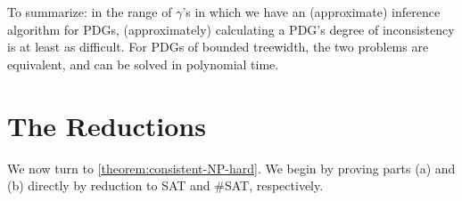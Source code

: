 To summarize: in the range of $\gamma$'s in which we have an (approximate) inference algorithm for PDGs, (approximately) calculating a PDG's degree of inconsistency is at least as difficult.
For PDGs of bounded treewidth, the two problems are equivalent, and can be solved in polynomial time. 



\section{The Reductions}
    \label{proofs:hardness-results}

We now turn to \cref{theorem:consistent-NP-hard}. We begin by proving
parts (a) and (b) directly
by reduction to SAT and \#SAT, respectively.

